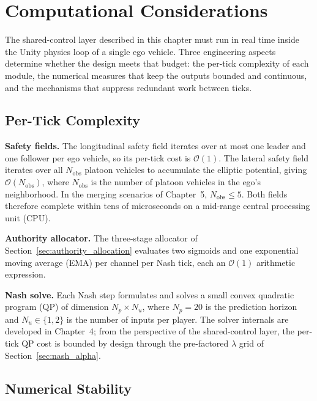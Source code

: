 \documentclass[12pt,a4paper,oneside]{report}
\begin{document}

\section{Computational Considerations}
\label{sec:chap3_compute}

The shared-control layer described in this chapter must run in real time inside the Unity physics loop of a single ego vehicle. Three engineering aspects determine whether the design meets that budget: the per-tick complexity of each module, the numerical measures that keep the outputs bounded and continuous, and the mechanisms that suppress redundant work between ticks.

\subsection{Per-Tick Complexity}
\label{sec:chap3_complexity}

\textbf{Safety fields.} The longitudinal safety field iterates over at most one leader and one follower per ego vehicle, so its per-tick cost is $\mathcal{O}(1)$. The lateral safety field iterates over all $N_{\mathrm{obs}}$ platoon vehicles to accumulate the elliptic potential, giving $\mathcal{O}(N_{\mathrm{obs}})$, where $N_{\mathrm{obs}}$ is the number of platoon vehicles in the ego's neighborhood. In the merging scenarios of Chapter~5, $N_{\mathrm{obs}} \leq 5$. Both fields therefore complete within tens of microseconds on a mid-range central processing unit (CPU).

\textbf{Authority allocator.} The three-stage allocator of Section~\ref{sec:authority_allocation} evaluates two sigmoids and one exponential moving average (EMA) per channel per Nash tick, each an $\mathcal{O}(1)$ arithmetic expression.

\textbf{Nash solve.} Each Nash step formulates and solves a small convex quadratic program (QP) of dimension $N_p \times N_u$, where $N_p = 20$ is the prediction horizon and $N_u \in \{1, 2\}$ is the number of inputs per player. The solver internals are developed in Chapter~4; from the perspective of the shared-control layer, the per-tick QP cost is bounded by design through the pre-factored $\lambda$ grid of Section~\ref{sec:nash_alpha}.

\subsection{Numerical Stability}
\label{sec:chap3_stability}
\end{document}
